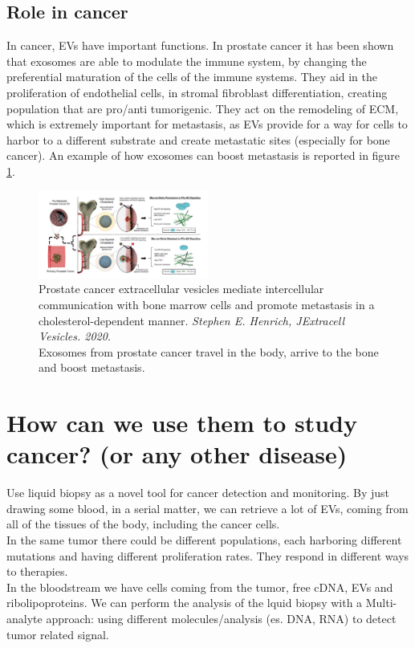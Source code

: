 \subsection{Role in cancer}
In cancer, EVs have important functions. In prostate cancer it has been shown that exosomes are able to modulate the immune system, by changing the preferential maturation of the cells of the immune systems. They aid in the proliferation of endothelial cells, in stromal fibroblast differentiation, creating population that are pro/anti tumorigenic. They act on the remodeling of ECM, which is extremely important for metastasis, as EVs provide for a way for cells to harbor to a different substrate and create metastatic sites (especially for bone cancer). An example of how exosomes can boost metastasis is reported in figure \ref{fig:cancer1}.

\begin{figure}[H]
    \centering
    \includegraphics[width=0.5\textwidth]{cancer1.png}
    \caption{Prostate cancer extracellular vesicles mediate intercellular communication with bone marrow cells and promote metastasis in a cholesterol-dependent manner.\textit{ Stephen E. Henrich, JExtracell Vesicles. 2020}.
    \\
    Exosomes from prostate cancer travel in the body, arrive to the bone and boost metastasis. }
    \label{fig:cancer1}
\end{figure}


\section{How can we use them to study cancer? (or any other disease)}
Use liquid biopsy as a novel tool for cancer detection and monitoring. By just drawing some blood, in a serial matter, we can retrieve a lot of EVs, coming from all of the tissues of the body, including the cancer cells.
\\
In the same tumor there could be different populations, each harboring different mutations and having different proliferation rates. They respond in different ways to therapies.
\\
In the bloodstream we have cells coming from the tumor, free cDNA, EVs and ribolipoproteins. We can perform the analysis of the lquid biopsy with a Multi-analyte approach: using different molecules/analysis (es. DNA, RNA) to detect tumor related signal.
\\

